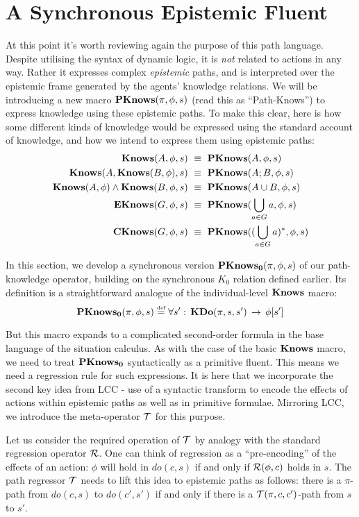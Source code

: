 \section{A Synchronous Epistemic Fluent\label{sub:Synchronous-Epistemic-Fluent}}

At this point it's worth reviewing again the purpose of this path
language. Despite utilising the syntax of dynamic logic, it is \emph{not}
related to actions in any way. Rather it expresses complex \emph{epistemic}
paths, and is interpreted over the epistemic frame generated by the
agents' knowledge relations. We will be introducing a new macro $\mathbf{PKnows}(\pi,\phi,s)$
(read this as {}``Path-Knows'') to express knowledge using these
epistemic paths. To make this clear, here is how some different kinds
of knowledge would be expressed using the standard account of knowledge,
and how we intend to express them using epistemic paths:\begin{align}
\mathbf{Knows}(A,\phi,s) & \,\,\equiv\,\,\mathbf{PKnows}(A,\phi,s)\nonumber \\
\mathbf{Knows}(A,\mathbf{Knows}(B,\phi),s) & \,\,\equiv\,\,\mathbf{PKnows}(A;B,\phi,s)\nonumber \\
\mathbf{Knows}(A,\phi)\wedge\mathbf{Knows}(B,\phi,s) & \,\,\equiv\,\,\mathbf{PKnows}(A\cup B,\phi,s)\nonumber \\
\mathbf{EKnows}(G,\phi,s) & \,\,\equiv\,\,\mathbf{PKnows}(\bigcup_{a\in G}a,\phi,s)\nonumber \\
\mathbf{CKnows}(G,\phi,s) & \,\,\equiv\,\,\mathbf{PKnows}((\bigcup_{a\in G}a)^{*},\phi,s)\label{eq:pknows_identities}\end{align}


In this section, we develop a synchronous version $\mathbf{PKnows_{0}}(\pi,\phi,s)$
of our path-knowledge operator, building on the synchronous $K_{0}$
relation defined earlier. Its definition is a straightforward analogue
of the individual-level $\mathbf{Knows}$ macro:\[
\mathbf{PKnows_{0}}(\pi,\phi,s)\stackrel{\mbox{\tiny def}}{=}\forall s':\,\mathbf{KDo}(\pi,s,s')\,\rightarrow\,\phi[s']\]


But this macro expands to a complicated second-order formula in the
base language of the situation calculus. As with the case of the basic
$\mathbf{Knows}$ macro, we need to treat $\mathbf{PKnows_{0}}$ syntactically as a primitive
fluent. This means we need a regression rule for such expressions.
It is here that we incorporate the second key idea from LCC - use
of a syntactic transform to encode the effects of actions within epistemic
paths as well as in primitive formulae. Mirroring LCC, we introduce
the meta-operator $\mathcal{T}$ for this purpose.

Let us consider the required operation of $\mathcal{T}$ by analogy with
the standard regression operator $\mathcal{R}$. One can think of regression
as a {}``pre-encoding'' of the effects of an action: $\phi$ will
hold in $do(c,s)$ if and only if $\mathcal{R}(\phi,c)$ holds in $s$. The
path regressor $\mathcal{T}$ needs to lift this idea to epistemic paths
as follows: there is a $\pi$-path from $do(c,s)$ to $do(c',s')$
if and only if there is a $\mathcal{T}(\pi,c,c')$-path from $s$ to $s'$.

